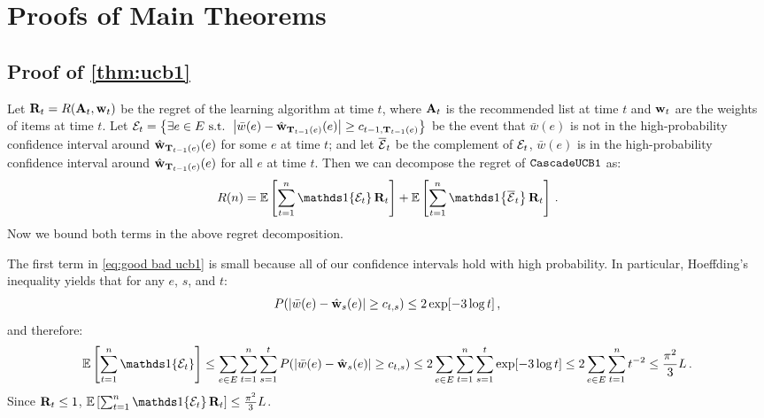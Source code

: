 
\clearpage
\onecolumn
\appendix

\section{Proofs of Main Theorems}
\label{sec:proofs}


\subsection{Proof of \cref{thm:ucb1}}
\label{sec:proof ucb1}

Let $\mathbf{R}_t = R(\mathbf{A}_t, \mathbf{w}_t)$ be the regret of the learning algorithm at time $t$, where $\mathbf{A}_t$ is the recommended list at time $t$ and $\mathbf{w}_t$ are the weights of items at time $t$. Let $\mathcal{E}_t = \left\{\exists e \in E \text{ s.t. } \left|\bar{w}(e) - \hat{\mathbf{w}}_{\mathbf{T}_{t - 1}(e)}(e)\right| \geq c_{t - 1, \mathbf{T}_{t - 1}(e)}\right\}$ be the event that $\bar{w}(e)$ is not in the high-probability confidence interval around $\hat{\mathbf{w}}_{\mathbf{T}_{t - 1}(e)}(e)$ for some $e$ at time $t$; and let $\overline{\mathcal{E}}_t$ be the complement of $\mathcal{E}_t$, $\bar{w}(e)$ is in the high-probability confidence interval around $\hat{\mathbf{w}}_{\mathbf{T}_{t - 1}(e)}(e)$ for all $e$ at time $t$. Then we can decompose the regret of ${\tt CascadeUCB1}$ as:
\begin{align}
  R(n) =
  \EE{\sum_{t = 1}^n \I{\cE_t} \rnd{R}_t} +
  \EE{\sum_{t = 1}^n \I{\ccE_t} \rnd{R}_t}\,.
  \label{eq:good bad ucb1}
\end{align}
Now we bound both terms in the above regret decomposition.

The first term in \eqref{eq:good bad ucb1} is small because all of our confidence intervals hold with high probability.
In particular, Hoeffding's inequality \citep[Theorem 2.8]{boucheron13concentration} yields that for any $e$, $s$, and $t$:
\begin{align*}
  P(\left|\bar{w}(e) - \hat{\mathbf{w}}_s(e)\right| \geq c_{t, s}) \leq 2 \exp[-3 \log t]\,,
\end{align*}
and therefore:
\begin{align*}
  \EE{\sum_{t = 1}^n \I{\cE_t}} \leq
  \sum_{e \in E} \sum_{t = 1}^n \sum_{s = 1}^t P(\abs{\bar{w}(e) - \hat{\rnd{w}}_s(e)} \geq c_{t, s}) \leq
  2 \sum_{e \in E} \sum_{t = 1}^n \sum_{s = 1}^t \exp[-3 \log t] \leq
  2 \sum_{e \in E} \sum_{t = 1}^n t^{-2} \leq
  \frac{\pi^2}{3} L\,.
\end{align*}
Since $\mathbf{R}_t \leq 1$, $\EE{\sum_{t = 1}^n \I{\cE_t} \rnd{R}_t} \leq \frac{\pi^2}{3} L$.

